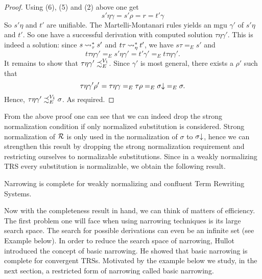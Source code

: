 \begin{theorem}
\begin{proof}
        Using (6), (5) and (2) above one get
        $$s'\eta\gamma = s'\rho = r = t'\gamma$$
        So $s'\eta$ and $t'$ are unifiable. The Martelli-Montanari rules yields an mgu $\gamma'$ of $s'\eta$ and $t'$. So one have a successful derivation with computed solution $\tau \eta \gamma'$. This is indeed a solution: since $s \mathbin{\rightsquigarrow}_{\tau}^* s'$ and $t\tau \mathbin{\rightsquigarrow}_{\eta}^{*} t'$, we have $s\tau =_E s'$ and
        $$t\tau \eta \gamma' =_E s'\eta\gamma' = t'\gamma' =_E t\tau\eta\gamma'.$$
        It remains to show that $\tau\eta \gamma' \iqoless[E][V_1]$. Since $\gamma'$ is most general, there exists a $\rho'$ such that
        $$\tau \eta \gamma' \rho' = \tau \eta \gamma =_E \tau \rho =_E \sigma\mathord{\downarrow} =_E \sigma.$$
        Hence, $\tau \eta \gamma' \iqoless[E][V_1] \sigma$. As required.
    \end{proof}
    From the above proof one can see that we can indeed drop the strong normalization condition if only normalized substitution is considered. Strong normalization of $\mathcal{R}$ is only used in the normalization of $\sigma$ to $\sigma\mathord{\downarrow}$, hence we can strengthen this result by dropping the strong normalization requirement and restricting ourselves to normalizable substitutions. Since in a weakly normalizing TRS every substitution is normalizable, we obtain the following result.
    \begin{corollary}
        Narrowing is complete for weakly normalizing and confluent Term Rewriting Systems.
    \end{corollary}
\end{theorem}

Now with the completeness result in hand, we can think of matters of efficiency. The first problem one will face when using narrowing techniques is its large search space. The search for possible derivations can even be an infinite set (see Example below). In order to reduce the search space of narrowing, Hullot \cite{hullot:cfunif} introduced the concept of basic narrowing. He showed that basic narrowing is complete for convergent TRSs. Motivated by the example below we study, in the next section, a restricted form of narrowing called basic narrowing.

